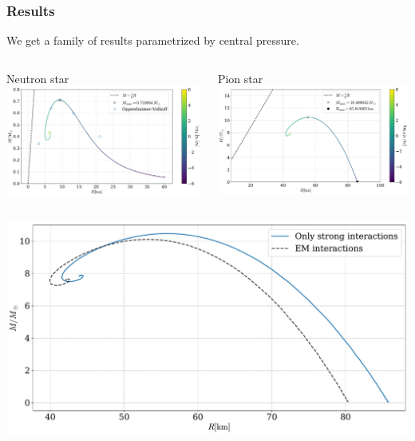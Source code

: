 \documentclass[aspectratio=169]{beamer}
\begin{document}
    \begin{frame}
        \frametitle{Results}
        We get a family of results parametrized by central pressure.
        \vspace{1cm}
        \begin{columns}
            \begin{column}{0.55\textwidth}
                Neutron star
                \includegraphics[width=\textwidth]{../../scripts/figurer/mass_radius_neutron.pdf}
            \end{column}
            \begin{column}{0.55\textwidth}
                Pion star
                \includegraphics[width=\textwidth]{../../scripts/figurer/pion_star/mass_radius_pion_star.pdf}
            \end{column}
        \end{columns}
    \end{frame}

    \begin{frame}
        \includegraphics[width=\textwidth]{../../scripts/figurer/pion_star/mass_radius_pion_star_compare.pdf}
    \end{frame}
\end{document}
